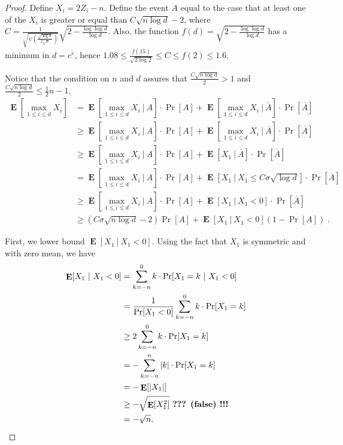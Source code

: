 \documentclass{article}
\DeclareMathOperator*{\Exp}{\mathbf{E}}
\begin{document}
\begin{proof}
Define $X_i = 2 Z_i-n$.  Define the event $A$ equal to the case that at least
one of the $X_i$ is greater or equal than $C \sqrt{n \log d}-2$, where
$C=\frac{1}{\sqrt{\psi\left(\frac{\sqrt{\log d}}{2
\sqrt{n}}\right)}}\sqrt{2-\frac{\log \log d}{\log d}}$. Also, the function
$f(d)=\sqrt{2-\frac{\log \log d}{\log d}}$ has a minimum in $d=e^e$, hence
$1.08 \le \frac{f(15)}{\sqrt{2 \log 2}} \le C\le f(2)\le 1.6$.

Notice that the condition on $n$ and $d$ assures that $\frac{C \sqrt{n \log d}}{2}>1$ and $\frac{C \sqrt{n \log d}}{2}\le \frac{1}{2} n - 1$.
\begin{align*}
\Exp \left[ \max_{1 \le i \le d} X_i \right]
& = \Exp \left[ \max_{1 \le i \le d} X_i ~\bigg|~ A \right] \cdot \Pr[A] + \Exp \left[ \max_{1 \le i \le d} X_i ~\bigg|~ \overline{A} \right] \cdot \Pr \left[ \overline{A} \right] \\
& \ge \Exp \left[ \max_{1 \le i \le d} X_i ~\bigg|~ A \right] \cdot \Pr[A] + \Exp \left[ \max_{1 \le i \le d} X_i ~\bigg|~ \overline{A} \right] \cdot \Pr \left[ \overline{A} \right]\\
& \ge \Exp \left[ \max_{1 \le i \le d} X_i ~\bigg|~ A \right] \cdot \Pr[A] + \Exp\left[ X_1 ~|~ \overline{A} \right] \cdot \Pr \left[ \overline{A} \right] \\
& = \Exp \left[ \max_{1 \le i \le d} X_i ~\bigg|~ A \right] \cdot \Pr[A] + \Exp \left[ X_1 ~\big|~ X_1 \le C \sigma \sqrt{\log d} \right] \cdot \Pr \left[ \overline{A} \right]\\
& \ge \Exp \left[ \max_{1 \le i \le d} X_i ~\bigg|~ A \right] \cdot \Pr[A] + \Exp \left[ X_1 ~|~ X_1 < 0 \right] \cdot \Pr \left[ \overline{A} \right] \\
& \ge (C \sigma \sqrt{n \log d} - 2) \Pr[A] + \Exp \left[ X_1 ~|~ X_1 < 0 \right] (1 - \Pr[A]) \; .
\end{align*}

First, we lower bound $\Exp[X_1~|~ X_1 < 0]$. Using the fact that $X_1$ is symmetric and with zero mean, we have
\begin{align*}
\Exp[X_1 ~|~ X_1 < 0]
& = \sum_{k=-n}^0 k \cdot \Pr[X_1 = k ~|~ X_1 < 0] \\
& = \frac{1}{\Pr[X_1 < 0]} \sum_{k=-n}^0 k \cdot \Pr[X_1 = k] \\
& \ge 2 \sum_{k=-n}^0 k \cdot \Pr[X_1 = k] \\
& = - \sum_{k=-n}^n |k| \cdot \Pr[X_1 = k] \\
& = - \Exp[|X_1|] \\
& \ge - \sqrt{\Exp[X_1^2]}  \ \text{\bf ??? (false) !!!} \\
& = -\sqrt{n}.
\end{align*}


\end{proof}
\end{document}

